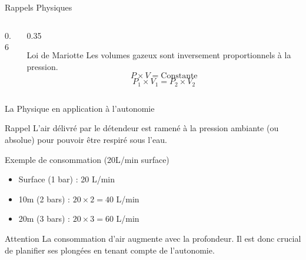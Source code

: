 \begin{frame}{Rappels Physiques}
\begin{columns}
\begin{column}{0.6\textwidth}
        \end{column}

        \begin{column}{0.35\textwidth}
            \begin{block}{Loi de Mariotte}
                Les volumes gazeux sont inversement proportionnels à la pression.
                $$ P \times V = \text{Constante} $$
                $$ P_1 \times V_1 = P_2 \times V_2 $$
            \end{block}
        \end{column}
    \end{columns}
\end{frame}

\begin{frame}{La Physique en application à l'autonomie}
    \begin{block}{Rappel}
        L'air délivré par le détendeur est ramené à la pression ambiante (ou absolue) 
        pour pouvoir être respiré sous l'eau.  
    \end{block}
    \begin{exampleblock}{Exemple de consommation (20L/min surface)}
        \begin{itemize}
            \item Surface (1 bar) : 20 L/min
            \item 10m (2 bars) : $20 \times 2 = 40$ L/min
            \item 20m (3 bars) : $20 \times 3 = 60$ L/min
        \end{itemize}
    \end{exampleblock}
    \begin{alertblock}{Attention}
        La consommation d'air augmente avec la profondeur. 
        Il est donc crucial de planifier ses plongées en tenant compte de l'autonomie.
    \end{alertblock}
\end{frame}

